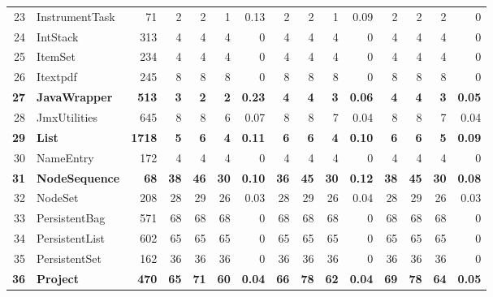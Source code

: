 \documentclass[conference]{IEEEtran}
\begin{document}
\begin{table} [htp!]
{\begin{tabularx}{0.91 \textwidth}{|r|l|r|r|r|r|r|r|r|r|r|r|r|r|r|}
23						& InstrumentTask			&71			& 2		&	2	&	1	& 	0.13					& 2		& 2 		& 1		& 		0.09			& 2			& 2			& 2			&	0	\\    
24						& IntStack					&313		& 4		&	4	&	4	& 	0					& 4		& 4 		& 4		& 		0			& 4			& 4			& 4			&	0	\\      
25						& ItemSet					&234		& 4		&	4	&	4	& 	0					& 4		& 4 		& 4		& 		0			& 4			& 4			& 4			&	0	\\       
26						& Itextpdf					&245		& 8		&	8	&	8	& 	0					& 8		&  8		& 8		& 		0			& 8			& 8			& 8			&	0\\      
\textbf{27}						& \textbf{JavaWrapper}				&\textbf{513}		&\textbf{3}		&	\textbf{2}	&	\textbf{2}	& 	\textbf{0.23}					& \textbf{4}		& \textbf{4} 		& \textbf{3}		& 		\textbf{0.06}			& \textbf{4}			& \textbf{4}			& \textbf{3}			&	\textbf{0.05}\\      
28						& JmxUtilities				&645		& 8		&	8	&	6	& 	0.07					& 8		& 8 		& 7		& 		0.04			& 8			& 8			& 7			&	0.04\\      
\textbf{29}						& \textbf{List}					&\textbf{1718}		& \textbf{5}		&	\textbf{6}	&	\textbf{4}	& 	\textbf{0.11}					& \textbf{6}		& \textbf{6} 		& \textbf{4}		& 		\textbf{0.10}			&\textbf{6}			& \textbf{6}			& \textbf{5}			&	\textbf{0.09}\\      
30						& NameEntry				&172		& 4		&	4	&	4	& 	0					& 4		& 4 		& 4		& 		0			& 4			& 4			& 4			&	0	\\  
\textbf{31}						& \textbf{NodeSequence}			&\textbf{68}			& \textbf{38}		&	\textbf{46}	&	\textbf{30}	& 	\textbf{0.10}					& \textbf{36}		& \textbf{45} 		& \textbf{30}		& 		\textbf{0.12}			& \textbf{38}			& \textbf{45}			& \textbf{30}			&	\textbf{0.08}	\\     
32						& NodeSet				&208		& 28		&	29	&	26	& 	0.03					& 28		& 29 		& 26		& 		0.04			& 28			& 29			& 26			&	0.03	\\  
33						& PersistentBag			&571		& 68		&	68	&	68	& 	0					& 68		&  68		& 68		& 		0			& 68			& 68			& 68			&	0	\\         
34						& PersistentList				&602		& 65		&	65	&	65	& 	0					& 65		&  65		& 65		& 		0			& 65			& 65			& 65			&	0	\\    
35						& PersistentSet				&162		& 36		&	36	&	36	& 	0					& 36		&  36		& 36		& 		0			& 36			& 36			& 36 			&	0	\\        
\textbf{36}						& \textbf{Project}					&\textbf{470}		& \textbf{65}		&	\textbf{71}	&	\textbf{60}	& 	\textbf{0.04}					& \textbf{66}		&  \textbf{78}		& \textbf{62}		& 		\textbf{0.04}			& \textbf{69}			& \textbf{78}			& \textbf{64}			&	\textbf{0.05}	\\        

\end{tabularx}}
\end{table}
\end{document}
